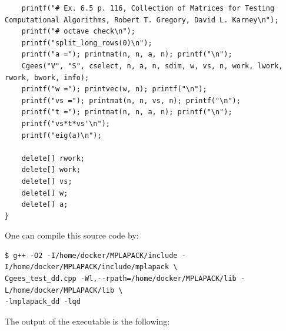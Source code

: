 \documentclass[12pt]{article}
\begin{document}
\begin{lstlisting}
    printf("# Ex. 6.5 p. 116, Collection of Matrices for Testing Computational Algorithms, Robert T. Gregory, David L. Karney\n");
    printf("# octave check\n");
    printf("split_long_rows(0)\n");
    printf("a ="); printmat(n, n, a, n); printf("\n");
    Cgees("V", "S", cselect, n, a, n, sdim, w, vs, n, work, lwork, rwork, bwork, info);
    printf("w ="); printvec(w, n); printf("\n");
    printf("vs ="); printmat(n, n, vs, n); printf("\n");
    printf("t ="); printmat(n, n, a, n); printf("\n");
    printf("vs*t*vs'\n");
    printf("eig(a)\n");

    delete[] rwork;
    delete[] work;
    delete[] vs;
    delete[] w;
    delete[] a;
}

\end{lstlisting}
One can compile this source code by:
\begin{verbatim}
$ g++ -O2 -I/home/docker/MPLAPACK/include -I/home/docker/MPLAPACK/include/mplapack \
Cgees_test_dd.cpp -Wl,--rpath=/home/docker/MPLAPACK/lib -L/home/docker/MPLAPACK/lib \
-lmplapack_dd -lqd
\end{verbatim}
The output of the executable is the following:
\end{document}
